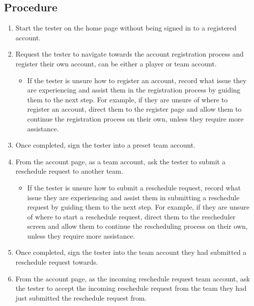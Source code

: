 \documentclass{article}
\begin{document}
    \subsection{Procedure}
    \begin{enumerate}
        \item Start the tester on the home page without being signed in to a
        registered account.
        \item Request the tester to navigate towards the account registration process
        and register their own account, can be either a player or team account.
        \begin{itemize}
            \item If the tester is unsure how to register an account, record what
            issue they are experiencing and assist them in the registration process
            by guiding them to the next step. For example, if they are unsure of where
            to register an account, direct them to the register page and allow them to
            continue the registration process on their own, unless they require more
            assistance.
        \end{itemize}
        \item Once completed, sign the tester into a preset team account.
        \item From the account page, as a team account, ask the tester to submit
        a reschedule request to another team.
        \begin{itemize}
            \item If the tester is unsure how to submit a reschedule request, record what
            issue they are experiencing and assist them in submitting a reschedule request
            by guiding them to the next step. For example, if they are unsure of where
            to start a reschedule request, direct them to the rescheduler screen and allow them to
            continue the rescheduling process on their own, unless they require more
            assistance.
        \end{itemize}
        \item Once completed, sign the tester into the team account they had submitted a
        reschedule request towards.
        \item From the account page, as the incoming reschedule request team account,
        ask the tester to accept the incoming reschedule request from the team they
        had just submitted the reschedule request from.
        \begin{itemize}

\end{itemize}
\end{enumerate}
\end{document}
